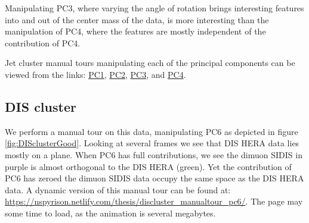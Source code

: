 \documentclass{monashthesis}
\theoremstyle{definition}
\theoremstyle{definition}
\theoremstyle{definition}
\theoremstyle{remark}
\begin{document}
Manipulating PC3, where varying the angle of rotation brings interesting
features into and out of the center mass of the data, is more
interesting than the manipulation of PC4, where the features are mostly
independent of the contribution of PC4.

Jet cluster manual tours manipulating each of the principal components
can be viewed from the links:
\href{https://nspyrison.netlify.com/thesis/jetcluster_manualtour_pc1/}{PC1},
\href{https://nspyrison.netlify.com/thesis/jetcluster_manualtour_pc2/}{PC2},
\href{https://nspyrison.netlify.com/thesis/jetcluster_manualtour_pc3/}{PC3},
and
\href{https://nspyrison.netlify.com/thesis/jetcluster_manualtour_pc4/}{PC4}.

\subsection{DIS cluster}\label{dis-cluster}

We perform a manual tour on this data, manipulating PC6 as depicted in
figure \ref{fig:DISclusterGood}. Looking at several frames we see that
DIS HERA data lies mostly on a plane. When PC6 has full contributions,
we see the dimuon SIDIS in purple is almost orthogonal to the DIS HERA
(green). Yet the contribution of PC6 has zeroed the dimuon SIDIS data
occupy the same space as the DIS HERA data. A dynamic version of this
manual tour can be found at:
\url{https://nspyrison.netlify.com/thesis/discluster_manualtour_pc6/}.
The page may some time to load, as the animation is several megabytes.
\end{document}
